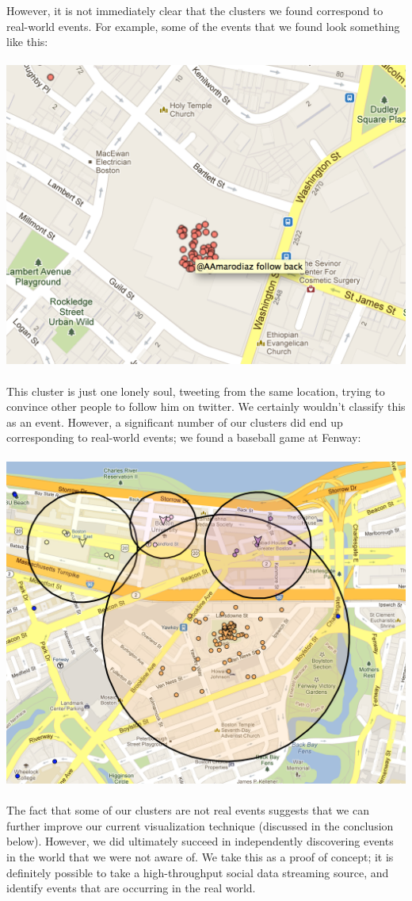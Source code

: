 \documentclass[pdftex,12pt,a4paper]{article}
\begin{document}
However, it is not immediately clear that the clusters we found correspond to real-world events. For example, some of the events that we found look something like this: \\ \\
\includegraphics[width=5.5in]{lonely.png} \\ \\
This cluster is just one lonely soul, tweeting from the same location, trying to convince other people to follow him on twitter. We certainly wouldn't classify this as an event. However, a significant number of our clusters did end up corresponding to real-world events; we found a baseball game at Fenway: \\ \\
\includegraphics[width=5.5in]{fenway1.png} \\ \\
The fact that some of our clusters are not real events suggests that we can further improve our current visualization technique (discussed in the conclusion below). However, we did ultimately succeed in independently discovering events in the world that we were not aware of. We take this as a proof of concept; it is definitely possible to take a high-throughput social data streaming source, and identify events that are occurring in the real world. 
\end{document}
